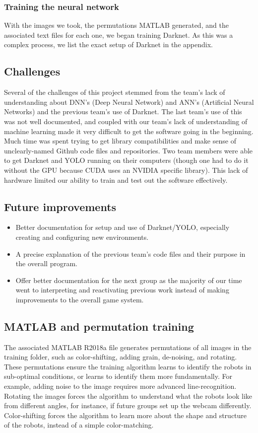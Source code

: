 \documentclass[a4paper,12pt]{article}
\begin{document}
	\subsubsection{Training the neural network}
	With the images we took, the permutations MATLAB generated, and the associated text files for each one, we began training Darknet. As this was a complex process, we list the exact setup of Darknet in the appendix.

\subsection{Challenges}
Several of the challenges of this project stemmed from the team's lack of understanding about DNN’s (Deep Neural Network) and ANN’s (Artificial Neural Networks) and the previous team's use of Darknet. The last team's use of this was not well documented, and coupled with our team’s lack of understanding of machine learning made it very difficult to get the software going in the beginning. Much time was spent trying to get library compatibilities and make sense of unclearly-named Github code files and repositories.
Two team members were able to get Darknet and YOLO running on their computers (though one had to do it without the GPU because CUDA uses an NVIDIA specific library). This lack of hardware limited our ability to train and test out the software effectively.

\subsection{Future improvements}
	\begin{itemize}
		\item Better documentation for setup and use of Darknet/YOLO, especially creating and configuring new environments. 
		\item A precise explanation of the previous team's code files and their purpose in the overall program. 
		\item Offer better documentation for the next group as the majority of our time went to interpreting and reactivating previous work instead of making improvements to the overall game system.
	\end{itemize}


\subsection{MATLAB and permutation training}
	The associated MATLAB R2018a file generates permutations of all images in the training folder, such as color-shifting, adding grain, de-noising, and rotating. These permutations ensure the training algorithm learns to identify the robots in sub-optimal conditions, or learns to identify them more fundamentally. For example, adding noise to the image requires more advanced line-recognition. Rotating the images forces the algorithm to understand what the robots look like from different angles, for instance, if future groups set up the webcam differently. Color-shifting forces the algorithm to learn more about the shape and structure of the robots, instead of a simple color-matching.\\
	
\end{document}
